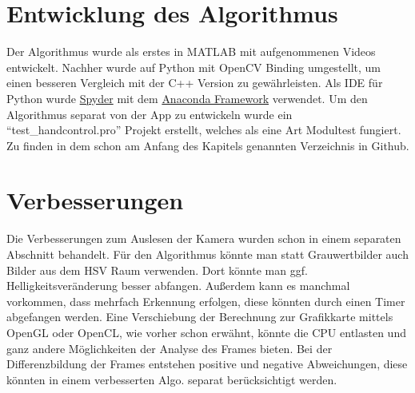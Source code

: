 \section{Entwicklung des Algorithmus}
Der Algorithmus wurde als erstes in MATLAB mit aufgenommenen Videos entwickelt. Nachher wurde auf Python mit OpenCV Binding umgestellt, um einen besseren Vergleich mit der C++ Version zu gewährleisten. Als IDE für Python wurde \href{https://github.com/spyder-ide/spyder}{Spyder} mit dem \href{https://www.continuum.io/downloads}{Anaconda Framework} verwendet. Um den Algorithmus separat von der App zu entwickeln wurde ein "`test\_handcontrol.pro"' Projekt erstellt, welches als eine Art Modultest fungiert. Zu finden in dem schon am Anfang des Kapitels genannten Verzeichnis in Github.

\section{Verbesserungen}
Die Verbesserungen zum Auslesen der Kamera wurden schon in einem separaten Abschnitt behandelt. Für den Algorithmus könnte man statt Grauwertbilder auch Bilder aus dem HSV Raum verwenden. Dort könnte man ggf. Helligkeitsveränderung besser abfangen. Außerdem kann es manchmal vorkommen, dass mehrfach Erkennung erfolgen, diese könnten durch einen Timer abgefangen werden. Eine Verschiebung der Berechnung zur Grafikkarte mittels OpenGL oder OpenCL, wie vorher schon erwähnt, könnte die CPU entlasten und ganz andere Möglichkeiten der Analyse des Frames bieten. Bei der Differenzbildung der Frames entstehen positive und negative Abweichungen, diese könnten in einem verbesserten Algo. separat berücksichtigt werden.

